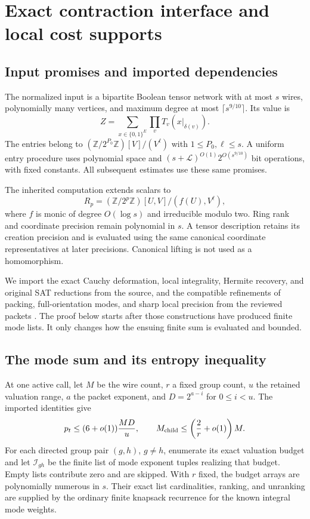 \section{Exact contraction interface and local cost supports}
\label{sec:interface}

\subsection{Input promises and imported dependencies}

The normalized input is a bipartite Boolean tensor network with at most
$s$ wires, polynomially many vertices, and maximum degree at most
$\lceil s^{9/10}\rceil$. Its value is
\[
 Z=\sum_{x\in\{0,1\}^{E}}\prod_v T_v(x|_{\delta(v)}).
\]
The entries belong to $(\mathbb Z/2^{P_0}\mathbb Z)[V]/(V^\ell)$ with
$1\le P_0,\ell\le s$. A uniform entry procedure uses polynomial space
and $(s+\mathcal L)^{O(1)}2^{O(s^{9/10})}$ bit operations, with fixed
constants. All subsequent estimates use these same promises.

The inherited computation extends scalars to
\[
 R_p=(\mathbb Z/2^p\mathbb Z)[U,V]/(f(U),V^\ell),
\]
where $f$ is monic of degree $O(\log s)$ and irreducible modulo two.
Ring rank and coordinate precision remain polynomial in $s$. A tensor
description retains its creation precision and is evaluated using the same
canonical coordinate representatives at later precisions. Canonical
lifting is not used as a homomorphism.

We import the exact Cauchy deformation, local integrality, Hermite recovery,
and original SAT reductions from the source, and the compatible refinements
of packing, full-orientation modes, and sharp local precision from the
reviewed packets \cite{openai,asymmetric,joint,flags,pairwise}. The proof
below starts after those constructions have produced finite mode lists.
It only changes how the ensuing finite sum is evaluated and bounded.

\subsection{The mode sum and its entropy inequality}

At one active call, let $M$ be the wire count, $r$ a fixed group count,
$u$ the retained valuation range, $a$ the packet exponent, and
$D=2^{a-i}$ for $0\le i<u$. The imported identities give
\[
 p_t\le (6+o(1))\frac{MD}{u},\qquad
 M_{\rm child}\le\left(\frac2r+o(1)\right)M.
\]
For each directed group pair $(g,h)$, $g\ne h$, enumerate its exact
valuation budget and let $\mathcal I_{gh}$ be the finite list of mode
exponent tuples realizing that budget. Empty lists contribute zero and are
skipped. With $r$ fixed, the budget arrays are polynomially numerous in $s$.
Their exact list cardinalities, ranking, and unranking are supplied by the
ordinary finite knapsack recurrence for the known integral mode weights.

